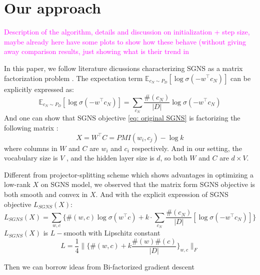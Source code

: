 \documentclass[letterpaper]{article} %
\begin{document}
\section{Our approach}
\textcolor{magenta}{Description of the algorithm, details and discussion on initialization + step size, maybe already here have some plots to show how these behave (without giving away comparison results, just showing what is their trend in}

In this paper, we follow literature dicussions characterizing SGNS as a matrix factorization problem \cite{levy2014neural}\cite{levy2015improving}. The expectation term $\mathbb{E}_{c_N\sim P_D}[\log \sigma(-w^\top c_N)]$ can be explicitly expressed as:
\begin{equation}
	\mathbb{E}_{c_N\sim P_D}[\log \sigma(-w^\top c_N)]=\sum_{c_N}\frac{\#(c_N)}{|D|}\log{\sigma(-w^\top c_N)}
\end{equation}
And one can show that SGNS objective \ref{eq: original SGNS} is factorizing the following matrix \cite{levy2014neural}:
\begin{equation}
	X=W^\top C= PMI(w_i, c_j)-\log k \label{eq: SPPMI}
\end{equation}
where columns in $W$ and $C$ are $w_i$ and $c_i$ respectively. And in our setting, the vocabulary size is $V$ , and the hidden layer size is $d$, so both $W$ and $C$ are $d\times V$.

Different from projector-splitting scheme\cite{fonarev2017riemannian} which shows advantages in optimizing a low-rank $X$ on SGNS model, we observed that the matrix form SGNS objective is both smooth and convex in $X$. And with the explicit expression of SGNS objective $L_{SGNS}(X)$:
\begin{equation}
	L_{SGNS}(X)=\sum_{w,c}\{\#(w,c)\log\sigma(w^\top c)+k\cdot\sum_{c_N}\frac{\#(c_N)}{|D|}[\log \sigma(-w^\top c_N)]\} \label{eq: smoothness}
\end{equation}
$L_{SGNS}(X)$ is $L-$smooth with Lipschitz constant $$L=\frac{1}{4}\|\{\#(w,c)+k\frac{\#(w)\#(c)}{|D|}\}_{w,c}\|_F$$



Then we can borrow ideas from Bi-factorized gradient descent  \cite{park2016finding}
\end{document}

